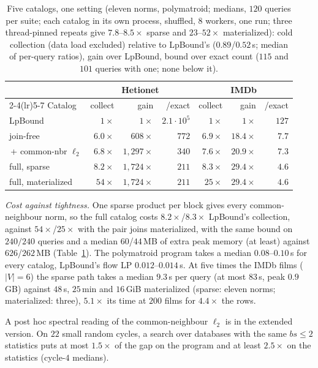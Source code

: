 \documentclass[conference]{IEEEtran}
\begin{document}
\begin{table}[t]
\centering
\caption{Five catalogs, one setting (eleven norms, polymatroid; medians,
$120$ queries per suite; each catalog in its own process, shuffled, $8$
workers, one run; three thread-pinned repeats give $7.8$--$8.5\times$
sparse and $23$--$52\times$ materialized): cold collection (data load excluded) relative to LpBound's
($0.89$/$0.52$\,s; median of per-query ratios), gain over LpBound, bound over exact count ($115$ and
$101$ queries with one; none below it).}
\label{tab:cost}
\small\setlength{\tabcolsep}{3pt}
\begin{tabular}{@{}lrrrrrr@{}}
\toprule
 & \multicolumn{3}{c}{Hetionet} & \multicolumn{3}{c}{IMDb} \\
\cmidrule(lr){2-4}\cmidrule(lr){5-7}
Catalog & collect & gain & /exact & collect & gain & /exact \\
\midrule
LpBound & $1\times$ & $1\times$ & $2.1{\cdot}10^{5}$ & $1\times$ & $1\times$ & $127$ \\
join-free & $6.0\times$ & $608\times$ & $772$ & $6.9\times$ & $18.4\times$ & $7.7$ \\
\,+ common-nbr $\ell_2$ & $6.8\times$ & $1{,}297\times$ & $340$ & $7.6\times$ & $20.9\times$ & $7.3$ \\
full, sparse &  $8.2\times$ & $1{,}724\times$ & $211$ & $8.3\times$ & $29.4\times$ & $4.6$ \\
full, materialized &  $54\times$ & $1{,}724\times$ & $211$ & $25\times$ & $29.4\times$ & $4.6$ \\
\bottomrule
\end{tabular}
\end{table}

\emph{Cost against tightness.} One sparse product per block gives every
common-neighbour norm, so the full catalog costs $8.2\times$/$8.3\times$
LpBound's collection, against $54\times$/$25\times$ with the pair joins
materialized, with the same bound on $240/240$ queries and a median
$60$/$44$\,MB of extra peak memory (at least) against $626$/$262$\,MB
(Table~\ref{tab:cost}). The polymatroid program takes a median
$0.08$--$0.10$\,s for every catalog, LpBound's flow LP $0.012$--$0.014$\,s.
At five times the IMDb films ($|V|{=}6$) the sparse path takes a median $9.3$\,s per query (at most $83$\,s, peak $0.9$\,GB) against $48$\,s, $25$\,min and $16$\,GiB materialized (sparse: eleven norms; materialized: three), $5.1\times$ its time at $200$ films for $4.4\times$ the rows.

A post hoc spectral reading of the common-neighbour $\ell_2$ is in the extended version. On $22$ small random cycles, a search over databases with the same
$bs{\le}2$ statistics puts at most $1.5\times$ of the gap on the program and
at least $2.5\times$ on the statistics (cycle-$4$ medians).
\end{document}

